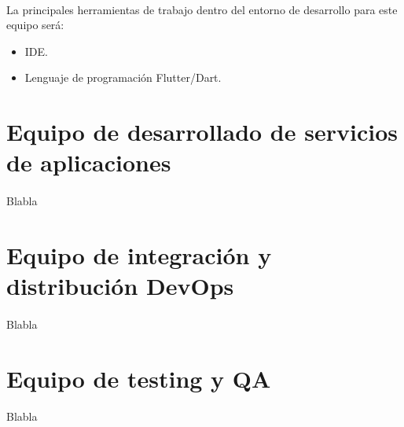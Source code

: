 \paragraph{}La principales herramientas de trabajo dentro del entorno de desarrollo para este equipo
será:

\begin{itemize}
    \item IDE.
    \item Lenguaje de programación Flutter/Dart.
\end{itemize}

\section{Equipo de desarrollado de servicios de aplicaciones}

\paragraph{}Blabla

\section{Equipo de integración y distribución DevOps}

\paragraph{}Blabla

\section{Equipo de testing y QA}

\paragraph{}Blabla

